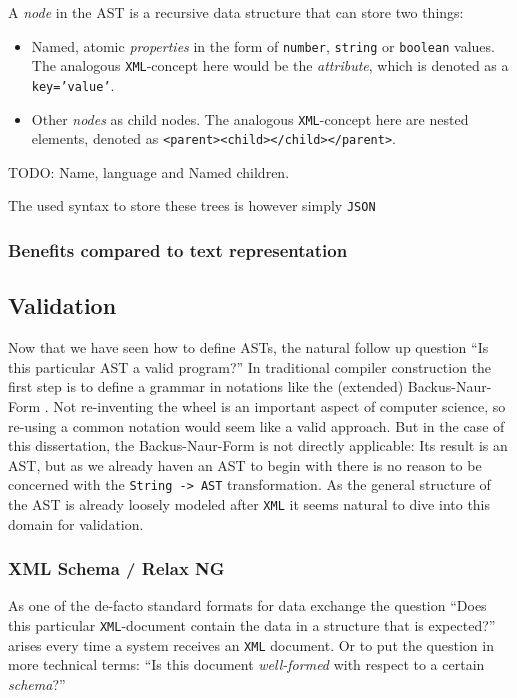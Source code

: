 A \textit{node} in the AST is a recursive data structure that can store two things:

\begin{itemize}
\item Named, atomic \textit{properties} in the form of \texttt{number}, \texttt{string} or \texttt{boolean} values. The analogous \texttt{XML}-concept here would be the \textit{attribute}, which is denoted as a \texttt{key='value'}.
\item Other \textit{nodes} as child nodes. The analogous \texttt{XML}-concept here are nested elements, denoted as \texttt{<parent><child></child></parent>}.
\end{itemize}

TODO: Name, language and Named children.

The used syntax to store these trees is however simply \texttt{JSON}

\subsubsection{Benefits compared to text representation}

\subsection{Validation}

Now that we have seen how to define ASTs, the natural follow up question \enquote{Is this particular AST a valid program?} In traditional compiler construction the first step is to define a grammar in notations like the (extended) Backus-Naur-Form \cite{knuth_backus_1964}. Not re-inventing the wheel is an important aspect of computer science, so re-using a common notation would seem like a valid approach. But in the case of this dissertation, the Backus-Naur-Form is not directly applicable: Its result is an AST, but as we already haven an AST to begin with there is no reason to be concerned with the \texttt{String -> AST} transformation. As the general structure of the AST is already loosely modeled after \texttt{XML} it seems natural to dive into this domain for validation.

\subsubsection{XML Schema / Relax NG}

As one of the de-facto standard formats for data exchange the question \enquote{Does this particular \texttt{XML}-document contain the data in a structure that is expected?} arises every time a system receives an \texttt{XML} document. Or to put the question in more technical terms: \enquote{Is this document \textit{well-formed} with respect to a certain \textit{schema}?}

